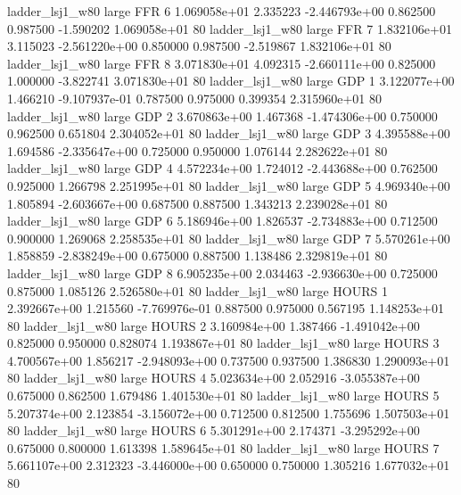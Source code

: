     ladder_lsj1_w80      large      FFR                 6 1.069058e+01      2.335223 -2.446793e+00 0.862500 0.987500      -1.590202 1.069058e+01 80
    ladder_lsj1_w80      large      FFR                 7 1.832106e+01      3.115023 -2.561220e+00 0.850000 0.987500      -2.519867 1.832106e+01 80
    ladder_lsj1_w80      large      FFR                 8 3.071830e+01      4.092315 -2.660111e+00 0.825000 1.000000      -3.822741 3.071830e+01 80
    ladder_lsj1_w80      large      GDP                 1 3.122077e+00      1.466210 -9.107937e-01 0.787500 0.975000       0.399354 2.315960e+01 80
    ladder_lsj1_w80      large      GDP                 2 3.670863e+00      1.467368 -1.474306e+00 0.750000 0.962500       0.651804 2.304052e+01 80
    ladder_lsj1_w80      large      GDP                 3 4.395588e+00      1.694586 -2.335647e+00 0.725000 0.950000       1.076144 2.282622e+01 80
    ladder_lsj1_w80      large      GDP                 4 4.572234e+00      1.724012 -2.443688e+00 0.762500 0.925000       1.266798 2.251995e+01 80
    ladder_lsj1_w80      large      GDP                 5 4.969340e+00      1.805894 -2.603667e+00 0.687500 0.887500       1.343213 2.239028e+01 80
    ladder_lsj1_w80      large      GDP                 6 5.186946e+00      1.826537 -2.734883e+00 0.712500 0.900000       1.269068 2.258535e+01 80
    ladder_lsj1_w80      large      GDP                 7 5.570261e+00      1.858859 -2.838249e+00 0.675000 0.887500       1.138486 2.329819e+01 80
    ladder_lsj1_w80      large      GDP                 8 6.905235e+00      2.034463 -2.936630e+00 0.725000 0.875000       1.085126 2.526580e+01 80
    ladder_lsj1_w80      large    HOURS                 1 2.392667e+00      1.215560 -7.769976e-01 0.887500 0.975000       0.567195 1.148253e+01 80
    ladder_lsj1_w80      large    HOURS                 2 3.160984e+00      1.387466 -1.491042e+00 0.825000 0.950000       0.828074 1.193867e+01 80
    ladder_lsj1_w80      large    HOURS                 3 4.700567e+00      1.856217 -2.948093e+00 0.737500 0.937500       1.386830 1.290093e+01 80
    ladder_lsj1_w80      large    HOURS                 4 5.023634e+00      2.052916 -3.055387e+00 0.675000 0.862500       1.679486 1.401530e+01 80
    ladder_lsj1_w80      large    HOURS                 5 5.207374e+00      2.123854 -3.156072e+00 0.712500 0.812500       1.755696 1.507503e+01 80
    ladder_lsj1_w80      large    HOURS                 6 5.301291e+00      2.174371 -3.295292e+00 0.675000 0.800000       1.613398 1.589645e+01 80
    ladder_lsj1_w80      large    HOURS                 7 5.661107e+00      2.312323 -3.446000e+00 0.650000 0.750000       1.305216 1.677032e+01 80
